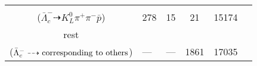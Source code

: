 \documentclass[landscape]{article}
\newcounter{rownumbers}
\newcommand\rn{\stepcounter{rownumbers}\arabic{rownumbers}}
\newcommand{\EOL}{\\} %
\newcommand{\topoTags}[1]{#1} %
\begin{document}
\begin{longtable}{clcccc}
\rn & \makecell[l]{ $ 
\bar{\Lambda}_{c}^{-} \rightarrow K^{*-} \bar{\Lambda} ,
K^{*-} \rightarrow \pi^{-} \bar{K}^{0} ,
\bar{\Lambda} \rightarrow \pi^{+} \bar{p} ,
\bar{K}^{0} \rightarrow K_{L}^{0} 
$ \\ ($
\bar{\Lambda}_{c}^{-} \dashrightarrow K_{L}^{0} \pi^{+} \pi^{-} \bar{p} 
$) } & \topoTags{278 & 15 & }21 & 15174 \EOL

rest & \makecell[l]{ $ 
\bar{\Lambda}_{c}^{-} \rightarrow \rm{others \  (481 \  in \  total)}
$ \\ ($
\bar{\Lambda}_{c}^{-} \dashrightarrow \rm{corresponding\ to\ others}
$) } & \topoTags{--- & --- & }1861 & 17035 \\ \hline

\end{longtable}

\clearpage
\end{document}
